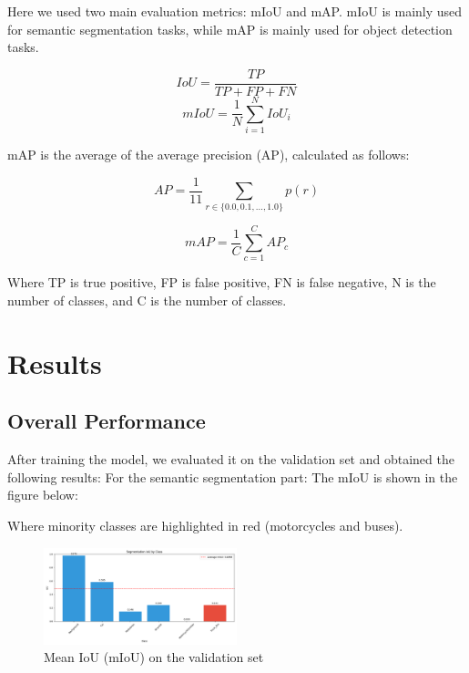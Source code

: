 \documentclass[conference]{IEEEtran}
\begin{document}



Here we used two main evaluation metrics: mIoU and mAP. mIoU is mainly used for semantic segmentation tasks, while mAP is mainly used for object detection tasks.

\[IoU = \frac{TP}{TP + FP + FN}\]
\[mIoU = \frac{1}{N} \sum_{i=1}^{N} IoU_i\]


mAP is the average of the average precision (AP), calculated as follows:

\[AP = \frac{1}{11} \sum_{r \in \{0.0, 0.1, \ldots, 1.0\}} p(r)\]

\[mAP = \frac{1}{C} \sum_{c=1}^{C} AP_c\]


Where TP is true positive, FP is false positive, FN is false negative, N is the number of classes, and C is the number of classes.

\section{Results}
\subsection{Overall Performance}


After training the model, we evaluated it on the validation set and obtained the following results:
For the semantic segmentation part:
The mIoU is shown in the figure below:


Where minority classes are highlighted in red (motorcycles and buses).


\begin{figure}[htbp]
    \centerline{\includegraphics[width=0.5\textwidth]{matrials/class_performance.png}}
    \caption{Mean IoU (mIoU) on the validation set}
    \label{fig:miou}
\end{figure}
\end{document}
